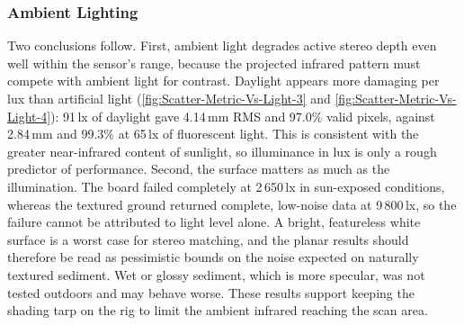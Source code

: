 
\subsubsection{Ambient Lighting}

Two conclusions follow. First, ambient light degrades active stereo depth even well within the sensor's range, because the projected infrared pattern must compete with ambient light for contrast. Daylight appears more damaging per lux than artificial light (\autoref{fig:Scatter-Metric-Vs-Light-3} and \autoref{fig:Scatter-Metric-Vs-Light-4}): 91\,lx of daylight gave 4.14\,mm RMS and 97.0\% valid pixels, against 2.84\,mm and 99.3\% at 65\,lx of fluorescent light. This is consistent with the greater near-infrared content of sunlight, so illuminance in lux is only a rough predictor of performance. Second, the surface matters as much as the illumination. The board failed completely at 2\,650\,lx in sun-exposed conditions, whereas the textured ground returned complete, low-noise data at 9\,800\,lx, so the failure cannot be attributed to light level alone. A bright, featureless white surface is a worst case for stereo matching, and the planar results should therefore be read as pessimistic bounds on the noise expected on naturally textured sediment. Wet or glossy sediment, which is more specular, was not tested outdoors and may behave worse. These results support keeping the shading tarp on the rig to limit the ambient infrared reaching the scan area.


